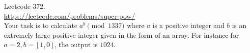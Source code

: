   Leetcode 372.\\
  \url{https://leetcode.com/problems/super-pow/} \\
  Your task is to calculate $a^b \pmod{1337}$ where $a$ is a positive integer
  and $b$ is an extremely large positive integer given in the form of an array.
  For instance
  for $a = 2, b = [1,0]$,
  the output is $1024$.
